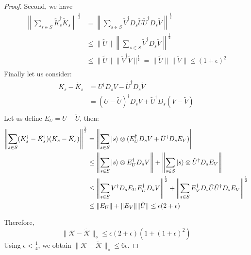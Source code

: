\begin{proof}
Second, we have
\begin{align}
    \left\|\sum_{s\in S}\tilde K_s^{\dagger} \tilde K_s \right\|^{\frac{1}{2}} &= \left\|\sum_{s\in S} \tilde V^{\dagger} D_s \tilde U\tilde U^{\dagger}  D_s \tilde V\right\|^{\frac{1}{2}} \\
     &\leq \|\tilde U\|\left\|\sum_{s\in S} \tilde V^{\dagger} D_s  \tilde V\right\|^{\frac{1}{2}}\\
     &\leq \|\tilde U\| \|\tilde V^{\dagger}  \tilde V\|^{\frac{1}{2}}= \|\tilde U\|\|\tilde V\| \leq (1+\epsilon)^2\\
\end{align}
Finally let us consider:
\begin{align}
    K_s-\tilde K_s &= U^{\dagger}  D_s V-\tilde U^{\dagger}  D_s \tilde V\\
    &=  (U-\tilde U)^{\dagger}  D_s V+\tilde U^{\dagger}  D_s (V-\tilde V)\\
\end{align}
Let us define $E_U = U - \tilde U$, then:
\begin{align}
    \left\|\sum_{s\in S}(K_s^\dagger - \tilde K_s^\dagger)(K_s - \tilde K_s)\right\|^{\frac{1}{2}}&= \left\| \sum_{s \in S}\ket{s} \otimes ( E_U^{\dagger}  D_s V+\tilde U^{\dagger}  D_sE_V)\right\|\\
    &\leq  \left\| \sum_{s \in S} \ket{s} \otimes E_U^{\dagger}  D_s V \right\| + \left\| \sum_{s \in S} \ket{s} \otimes \tilde U^{\dagger}  D_sE_V\right\|\\
    &\leq \left\| \sum_{s \in S}  V^{\dagger}  D_sE_UE_U^{\dagger} D_s  V\right\|^{\frac{1}{2}} +  \left\| \sum_{s \in S} E_V^{\dagger}  D_s \tilde U \tilde U^{\dagger} D_s E_V \right\|^{\frac{1}{2}}\\
    &\leq \|E_U\| + \|E_V\|\|\tilde U\| \leq \epsilon(2+\epsilon)
\end{align}

Therefore,
\begin{equation}
    \|\mathcal{K} - \tilde{\mathcal{K}}\|_{\diamond} \leq \epsilon(2+\epsilon)(1+(1+\epsilon)^2)
\end{equation}
Using $\epsilon<\frac14$, we obtain $\|\mathcal{K} - \tilde {\mathcal{K}}\|_{\diamond} \leq 6\epsilon$.
\end{proof}
